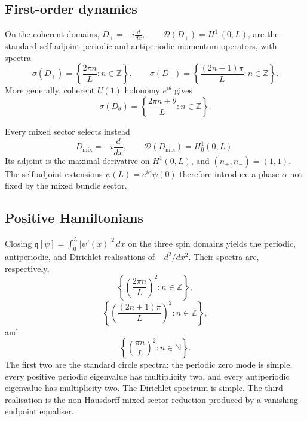 \documentclass[11pt]{article}
\theoremstyle{plain}
\theoremstyle{definition}
\begin{document}
\subsection{First-order dynamics}
\label{subsec:circle-k-Dirac}

On the coherent domains,
\(D_\pm=-i\frac{d}{dx}, \qquad \mathcal D(D_\pm)=H^1_\pm(0,L)\),
are the standard self-adjoint periodic and antiperiodic momentum operators,
with spectra
\[
  \sigma(D_+)
  =
  \left\{
    \frac{2\pi n}{L}:n\in\mathbb Z
  \right\},
  \qquad
  \sigma(D_-)
  =
  \left\{
    \frac{(2n+1)\pi}{L}:n\in\mathbb Z
  \right\}.
\]
More generally, coherent \(U(1)\) holonomy \(e^{i\theta}\) gives
\[
  \sigma(D_\theta)
  =
  \left\{
    \frac{2\pi n+\theta}{L}:n\in\mathbb Z
  \right\}.
\]

Every mixed sector selects instead
\[
  D_{\mathrm{mix}}
  =
  -i\frac{d}{dx},
  \qquad
  \mathcal D(D_{\mathrm{mix}})=H^1_0(0,L).
\]
Its adjoint is the maximal derivative on \(H^1(0,L)\), and
\((n_+,n_-)=(1,1)\).
The self-adjoint extensions \(\psi(L)=e^{i\alpha}\psi(0)\) therefore introduce a phase \(\alpha\) not fixed by the mixed bundle
sector.

\subsection{Positive Hamiltonians}
\label{subsec:circle-k-positive}

Closing \(\mathfrak q[\psi] = \int_0^L|\psi'(x)|^2\,dx\) on the three spin domains yields the periodic, antiperiodic, and Dirichlet
realisations of \(-d^2/dx^2\). Their spectra are, respectively,
\[
  \left\{
    \left(
      \frac{2\pi n}{L}
    \right)^2:
    n\in\mathbb Z
  \right\},
\]
\[
  \left\{
    \left(
      \frac{(2n+1)\pi}{L}
    \right)^2:
    n\in\mathbb Z
  \right\},
\]
and
\[
  \left\{
    \left(
      \frac{\pi n}{L}
    \right)^2:
    n\in\mathbb N
  \right\}.
\]
The first two are the standard circle spectra: the periodic zero mode is
simple, every positive periodic eigenvalue has multiplicity two, and every
antiperiodic eigenvalue has multiplicity two. The Dirichlet spectrum is
simple. The third realisation is the non-Hausdorff mixed-sector reduction
produced by a vanishing endpoint equaliser.
\end{document}
